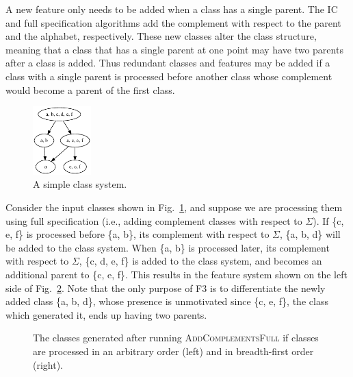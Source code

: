 \documentclass[12pt, oneside]{article}   	%
\begin{document}
A new feature only needs to be added when a class has a single parent. The IC and full specification algorithms add the complement with respect to the parent and the alphabet, respectively. These new classes alter the class structure, meaning that a class that has a single parent at one point may have two parents after a class is added. Thus redundant classes and features may be added if a class with a single parent is processed before another class whose complement would become a parent of the first class.

\begin{figure}[htb!]
	\centering
	\includegraphics[width=0.2\textwidth]{bfs1.png}
	\caption{A simple class system.}
	\label{fig:bfs1}
\end{figure}

Consider the input classes shown in Fig.~\ref{fig:bfs1}, and suppose we are processing them using full specification (i.e., adding complement classes with respect to $\Sigma$). If \{c, e, f\} is processed before \{a, b\}, its complement with respect to $\Sigma$, \{a, b, d\} will be added to the class system. When \{a, b\} is processed later, its complement with respect to $\Sigma$, \{c, d, e, f\} is added to the class system, and becomes an additional parent to \{c, e, f\}. This results in the feature system shown on the left side of Fig.~\ref{fig:bfsfeats}. Note that the only purpose of F3 is to differentiate the newly added class \{a, b, d\}, whose presence is unmotivated since \{c, e, f\}, the class which generated it, ends up having two parents.

\begin{figure}[htb!]
	\centering
	\qquad
	\caption{The classes generated after running \textsc{AddComplementsFull} if classes are processed in an arbitrary order (left) and in breadth-first order (right).}
	\label{fig:bfsfeats}
\end{figure}
\end{document}
